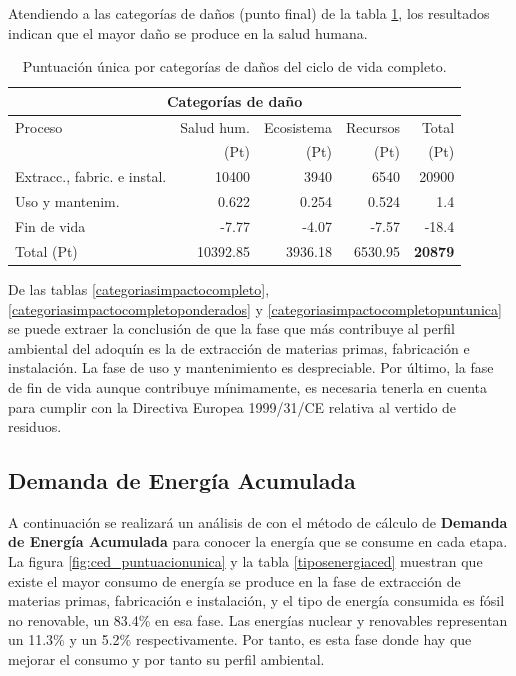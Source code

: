 Atendiendo a las categorías de daños (punto final) de la tabla \ref{categoriasdanoscompleto}, los resultados indican que el mayor daño se produce en la salud humana.

\begin{table}[!htb]
\centering
\begin{tabular}{p{6cm}rrrr}
\toprule
\multicolumn{5}{c}{Categorías de daño}\\
\midrule
Proceso & Salud hum. & Ecosistema & Recursos & Total\\
 & (Pt) & (Pt) &  (Pt) & (Pt)\\
\midrule
Extracc., fabric. e instal. & 10400 & 3940 & 6540 & 20900\\
Uso y mantenim. & 0.622 & 0.254 & 0.524 & 1.4\\
Fin de vida & -7.77 & -4.07 & -7.57 & -18.4\\
\midrule
Total (Pt) & 10392.85 & 3936.18 & 6530.95 & \textbf{20879}\\
\bottomrule
\end{tabular}
\caption{Puntuación única por categorías de daños del ciclo de vida completo.}
\label{categoriasdanoscompleto}
\end{table}

De las tablas \ref{categoriasimpactocompleto}, \ref{categoriasimpactocompletoponderados} y \ref{categoriasimpactocompletopuntunica} se puede extraer la conclusión de que la fase que más contribuye al perfil ambiental del adoquín es la de extracción de materias primas, fabricación e instalación. La fase de uso y mantenimiento es despreciable. Por último, la fase de fin de vida aunque contribuye mínimamente, es necesaria tenerla en cuenta para cumplir con la Directiva Europea 1999/31/CE relativa al vertido de residuos.

\subsection{Demanda de Energía Acumulada}
A continuación se realizará un análisis de con el método de cálculo de \textbf{Demanda de Energía Acumulada} para conocer la energía que se consume en cada etapa. La figura \ref{fig:ced_puntuacionunica} y la tabla \ref{tiposenergiaced} muestran que existe el mayor consumo de energía se produce en la fase de extracción de materias primas, fabricación e instalación, y el tipo de energía consumida es fósil no renovable, un 83.4\% en esa fase. Las energías nuclear y renovables representan un 11.3\% y un 5.2\% respectivamente. Por tanto, es esta fase donde hay que mejorar el consumo y por tanto su perfil ambiental.


